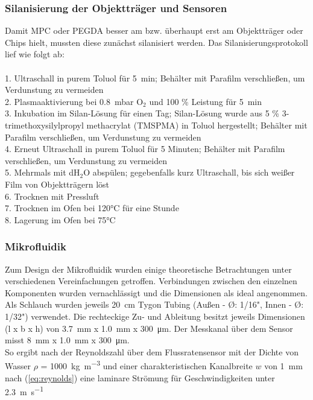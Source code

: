 \subsubsection{Silanisierung der Objektträger und Sensoren}

Damit MPC oder PEGDA besser am bzw. überhaupt erst am Objektträger oder Chips hielt, mussten diese zunächst silanisiert werden. Das Silanisierungsprotokoll lief wie folgt ab: \\
\\
1. Ultraschall in purem Toluol für \SI{5}{\minute}; Behälter mit Parafilm verschließen, um Verdunstung zu vermeiden\\
2. Plasmaaktivierung bei \SI{0.8}{\milli\bar} O$_2$ und 100 \% Leistung für \SI{5}{\minute} \\
3. Inkubation im Silan-Lösung für einen Tag; Silan-Lösung wurde aus 5 \% 3-trimethoxysilylpropyl methacrylat (TMSPMA) in Toluol hergestellt; Behälter mit Parafilm verschließen, um Verdunstung zu vermeiden\\
4. Erneut Ultraschall in purem Toluol für 5 Minuten; Behälter mit Parafilm verschließen, um Verdunstung zu vermeiden\\
5. Mehrmals mit dH$_2$O abspülen; gegebenfalls kurz Ultraschall, bis sich weißer Film von Objektträgern löst \\
6. Trocknen mit Pressluft \\
7. Trocknen im Ofen bei 120°C für eine Stunde \\
8. Lagerung im Ofen bei 75°C

\clearpage

\subsubsection{Mikrofluidik}
Zum Design der Mikrofluidik wurden einige theoretische Betrachtungen unter verschiedenen Vereinfachungen getroffen. Verbindungen zwischen den einzelnen Komponenten wurden vernachlässigt und die Dimensionen als ideal angenommen. Als Schlauch wurden jeweils \SI{20}{\centi\meter} Tygon Tubing (Außen - \O{}: 1/16", Innen - \O{}: 1/32") verwendet. Die rechteckige Zu- und Ableitung besitzt jeweils Dimensionen (l x b x h) von \SI{3.7}{\milli\meter} x \SI{1.0}{\milli\meter} x \SI{300}{\micro\meter}. Der Messkanal über dem Sensor misst \SI{8}{\milli\meter} x  \SI{1.0}{\milli\meter} x \SI{300}{\micro\meter}.\\
  
So ergibt nach der Reynoldszahl über dem Flussratensensor mit der Dichte von Wasser $\rho$ = \SI{1000}{\kilo\gram\per\cubic\meter} und einer charakteristischen Kanalbreite $w$ von \SI{1}{\milli\meter} nach (\ref{eq:reynolds}) eine laminare Strömung für Geschwindigkeiten unter \SI{2.3}{\meter\per\second}

